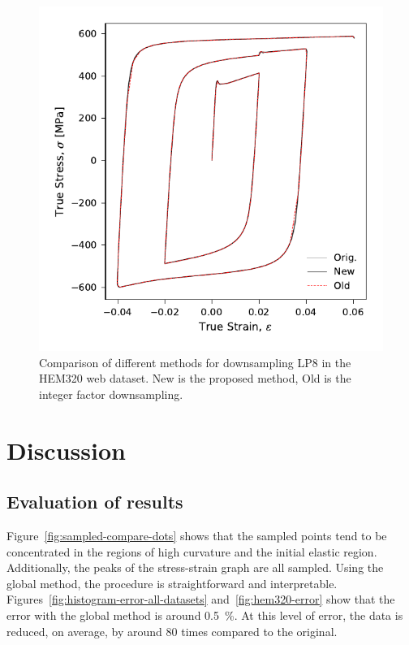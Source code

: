 \documentclass[a4paper,11pt]{article}
\begin{document}
\begin{figure}
    \centering
    \includegraphics{LP8_WP3_HEM320_C_CRM20.pdf}
    \caption{Comparison of different methods for downsampling LP8 in the HEM320 web dataset. New is the proposed method, Old is the integer factor downsampling.}
    \label{fig:hem320-lp8-compare-methods}
\end{figure}


\section{Discussion}

\subsection{Evaluation of results}

Figure~\ref{fig:sampled-compare-dots} shows that the sampled points tend to be concentrated in the regions of high curvature and the initial elastic region.
Additionally, the peaks of the stress-strain graph are all sampled.
Using the global method, the procedure is straightforward and interpretable.
Figures~\ref{fig:histogram-error-all-datasets} and~\ref{fig:hem320-error} show that the error with the global method is around 0.5~\%.
At this level of error, the data is reduced, on average, by around 80 times compared to the original.
\end{document}
